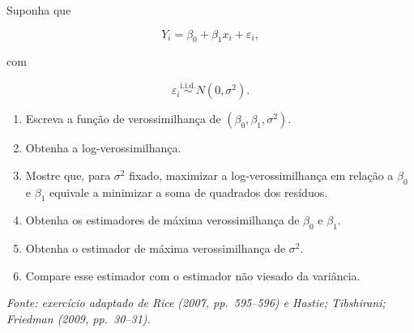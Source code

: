 \documentclass[
  letterpaper,
  DIV=11,
  numbers=noendperiod]{scrreprt}
\providecommand{\tightlist}{%
  \setlength{\itemsep}{0pt}\setlength{\parskip}{0pt}}\usepackage{longtable,booktabs,array}
\begin{document}
\begin{tcolorbox}[enhanced jigsaw, colback=white, leftrule=.75mm, colbacktitle=quarto-callout-tip-color!10!white, breakable, titlerule=0mm, bottomtitle=1mm, title=\textcolor{quarto-callout-tip-color}{\faLightbulb}\hspace{0.5em}{Exercício 4 --- Equivalência com máxima verossimilhança}, colframe=quarto-callout-tip-color-frame, toprule=.15mm, opacityback=0, bottomrule=.15mm, opacitybacktitle=0.6, arc=.35mm, toptitle=1mm, rightrule=.15mm, coltitle=black, left=2mm]

Suponha que

\[Y_i
=
\beta_0+\beta_1x_i+\varepsilon_i,\]

com

\[\varepsilon_i
\overset{\mathrm{i.i.d.}}{\sim}
N(0,\sigma^2).\]

\begin{enumerate}
\def\labelenumi{\arabic{enumi}.}
\tightlist
\item
  Escreva a função de verossimilhança de \((\beta_0,\beta_1,\sigma^2)\).
\item
  Obtenha a log-verossimilhança.
\item
  Mostre que, para \(\sigma^2\) fixado, maximizar a log-verossimilhança
  em relação a \(\beta_0\) e \(\beta_1\) equivale a minimizar a soma de
  quadrados dos resíduos.
\item
  Obtenha os estimadores de máxima verossimilhança de \(\beta_0\) e
  \(\beta_1\).
\item
  Obtenha o estimador de máxima verossimilhança de \(\sigma^2\).
\item
  Compare esse estimador com o estimador não viesado da variância.
\end{enumerate}

\emph{Fonte: exercício adaptado de Rice (2007, pp.~595--596) e Hastie;
Tibshirani; Friedman (2009, pp.~30--31).}

\end{tcolorbox}
\end{document}
